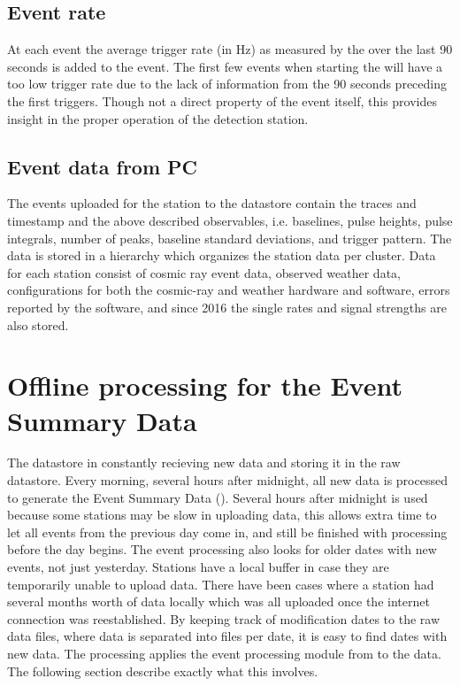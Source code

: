 \subsection{Event rate}

At each event the average trigger rate (in \si{\hertz}) as measured by the \daq over the last 90 seconds is added to the event. The first few events when starting the \daq will have a too low trigger rate due to the lack of information from the 90 seconds preceding the first triggers. Though not a direct property of the event itself, this provides insight in the proper operation of the detection station.


\subsection{Event data from PC}

The events uploaded for the station to the datastore contain the traces and timestamp and the above described observables, i.e. baselines, pulse heights, pulse integrals, number of peaks, baseline standard deviations, and trigger pattern. The data is stored in a hierarchy which organizes the station data per cluster. Data for each station consist of cosmic ray event data, observed weather data, configurations for both the cosmic-ray and weather hardware and software, errors reported by the software, and since 2016 the single rates and \gps signal strengths are also stored.


\section{Offline processing for the Event Summary Data}

The datastore in constantly recieving new data and storing it in the raw datastore. Every morning, several hours after \utc midnight, all new data is processed to generate the Event Summary Data (\esd). Several hours after midnight is used because some stations may be slow in uploading data, this allows extra time to let all events from the previous day come in, and still be finished with processing before the day begins. The event processing also looks for older dates with new events, not just yesterday. Stations have a local buffer in case they are temporarily unable to upload data. There have been cases where a station had several months worth of data locally which was all uploaded once the internet connection was reestablished. By keeping track of modification dates to the raw data files, where data is separated into files per date, it is easy to find dates with new data. The processing applies the event processing module from \sapphire to the data. The following section describe exactly what this involves.


